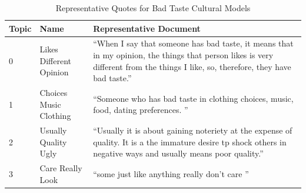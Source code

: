 \begin{table}[htpb]
\centering
\footnotesize
\begin{tabular}{lp{3.5cm}p{10cm}}
\toprule
Topic & Name & Representative Document \\
\midrule
0 & Likes Different Opinion & ``When I say that someone has bad taste, it means that in my opinion, the things that person likes is very different from the things I like, so, therefore, they have bad taste.'' \\
1 & Choices Music Clothing & ``Someone who has bad taste in clothing choices, music, food, dating preferences. '' \\
2 & Usually Quality Ugly & ``Usually it is about gaining noteriety at the expense of quality. It is a the immature desire tp shock others in negative ways and usually means poor quality.'' \\
3 & Care Really Look & ``some just like anything  really don't care '' \\
\bottomrule
\end{tabular}
\caption{Representative Quotes for Bad Taste Cultural Models}
\label{tab:bad_taste_rep_docs}
\end{table}
